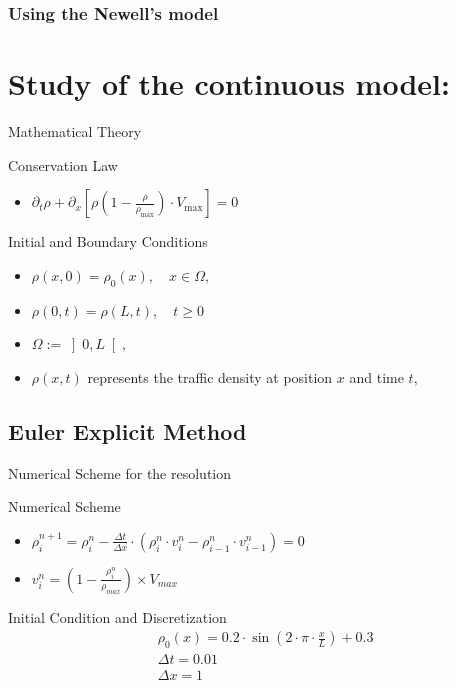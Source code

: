 \documentclass{beamer}
\begin{document}
\subsubsection{Using the Newell's model}
\section{Study of the continuous model:}
\begin{frame}{Mathematical Theory}
	\begin{alertblock}{Conservation Law}
		\begin{itemize}
			\item $\partial_t\rho + \partial_x\left[ \rho\left( 1-\frac{\rho}{\rho_{\text{max}}}\right) \cdot V_{\text{max}}\right] = 0 $
		\end{itemize}
	\end{alertblock}
	\begin{block}{Initial and Boundary Conditions}
		\begin{itemize}
			\item $\rho(x,0) = \rho_0(x), \quad x \in \Omega,$
			\item $\rho(0,t) = \rho(L,t), \quad t \geq 0$
			\item $\Omega := \left] 0,L\right[, $
			\item $\rho(x,t)$ represents the traffic density at position $x$ and time $t$, 
		\end{itemize}
	\end{block}
\end{frame}

\subsection{Euler Explicit Method}
\begin{frame}{Numerical Scheme for the resolution}
	\begin{alertblock}{Numerical Scheme}
		\begin{itemize}
			\item $\rho_{i}^{n+1} = \rho_i^n - \frac{\Delta t}{\Delta x} \cdot \left(\rho_i^n \cdot v_i^n - \rho_{i-1}^n \cdot v_{i-1}^n \right)
					=0$
		
			\item $v_i^n = \left( 1 - \frac{\rho_i^n}{\rho_{max}}\right)  \times V_{max}$
		\end{itemize}
	\end{alertblock}
	\begin{block}{Initial Condition and Discretization}
		\[
		\boxed{
			\begin{aligned}
				&\rho_0(x)=0.2 \cdot \sin\left(2 \cdot \pi \cdot \frac{x}{L}\right) + 0.3 \\
				&\Delta t = 0.01 \\
				&\Delta x = 1
			\end{aligned}
		}
		\]
	\end{block}
\end{frame}
\end{document}
